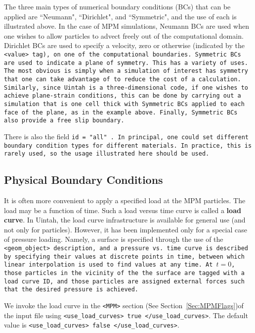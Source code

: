 The three main types of numerical boundary conditions (BCs) that can
be applied are ``Neumann", ``Dirichlet", and ``Symmetric", and the use of
each is illustrated above.  In the case of
MPM simulations, Neumann BCs are used when one wishes to allow particles to
advect freely out of the computational domain.  Dirichlet BCs are used to
specify a velocity, zero or otherwise (indicated by the \tt <value> \normalfont
tag), on one of the computational boundaries.
Symmetric BCs are used to indicate a plane of symmetry.  This has a variety
of uses.  The most obvious is simply when a simulation of interest has symmetry
that one can take advantage of to reduce the cost of a calculation.  Similarly,
since Uintah is a three-dimensional code, if one wishes to achieve plane-strain
conditions, this can be done by carrying out a simulation that is one cell thick
with Symmetric BCs applied to each face of the plane, as in the example above.
Finally, Symmetric BCs also provide a free slip boundary.

There is also the field \tt id = "all" \normalfont.  In principal, one could
set different boundary condition types for different materials.  In practice,
this is rarely used, so the usage illustrated here should be used.

\subsection{Physical Boundary Conditions} \label{sec:PhysicalBCs}

It is often more convenient to apply a specified load at the MPM particles.
The load may be a function of time.  Such a load versus time curve is called
a {\bf load curve}.
In Uintah, the load curve infrastructure is available for general use
(and not only for particles).  However, it has been implemented only for
a special case of pressure loading.  Namely, a surface is
specified through the use of the \tt <geom\_object> \normalfont description,
and a pressure vs. time curve is described by specifying their values
at discrete points in time, between which linear interpolation is used
to find values at any time.  At $t=0$, those particles in the vicinity
of the the surface are tagged with a load curve ID, and those particles
are assigned external forces such that the desired pressure is achieved.

We invoke the load curve in the \verb|<MPM>| section
(See Section~\ref{Sec:MPMFlags})of the input file
using  \verb|<use_load_curves> true </use_load_curves>|.  The default value
is \verb|<use_load_curves> false </use_load_curves>|.

